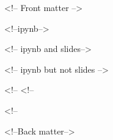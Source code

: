 <!-- Front matter -->


 <!--ipynb-->

 <!-- ipynb and slides-->

\else <!-- ipynb but not slides -->

\endif 
\else <!--%
 <!--%

\endif



\else

\endif
\else <!--%

\endif
\endif

<!--Back matter-->




